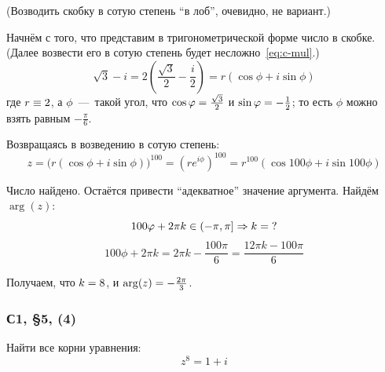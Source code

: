 \documentclass[a4paper,12pt]{article}
\begin{document}
  \begin{solution}
    (Возводить скобку в сотую степень ``в лоб'', очевидно, не вариант.)

    Начнём с того, что представим в тригонометрической форме число в скобке.
    (Далее возвести его в сотую степень будет несложно~\eqref{eq:c-mul}.)
    \[
      \sqrt{3} - i = 2 \left(\frac{\sqrt 3}{2} - \frac{i}{2}\right) = r (\cos\phi + i \sin\phi)
    \]
    где $r \hm\equiv 2$, а $\phi$~---~такой угол, что $\cos\phi \hm= \frac{\sqrt 3}{2}$ и $\sin\phi \hm= -\frac{1}{2}$; то есть $\phi$ можно взять равным $-\frac{\pi}{6}$.

    Возвращаясь в возведению в сотую степень:
    \[
      z = \bigl(r (\cos\phi + i \sin\phi)\bigr)^{100} = \left(r e^{i \phi}\right)^{100} = r^{100} (\cos{100 \phi} + i \sin{100 \phi})
    \]

    Число найдено.
    Остаётся привести ``адекватное'' значение аргумента. %
    Найдём $\arg(z)$:
    \[
      100 \varphi + 2 \pi k \in (-\pi, \pi] \Rightarrow k = \operatorname{?}
    \]
    \[
      100 \phi + 2 \pi k = 2 \pi k - \frac{100 \pi}{6} = \frac{12 \pi k - 100 \pi}{6}
    \]

    Получаем, что $k \hm= 8$, и $\arg(z) \hm= -\frac{2 \pi}{3}$.
  \end{solution}

  
  \subsubsection{С1, \S 5, (4)}

  Найти все корни уравнения:
  \[
    z^8 = 1 + i
  \]
  
\end{document}
